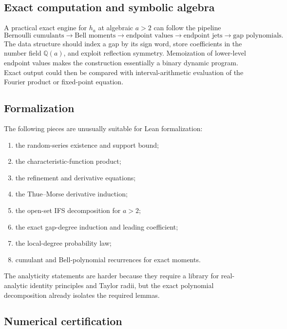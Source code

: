 \documentclass[11pt,oneside]{article}
\theoremstyle{definition}
\theoremstyle{remark}
\begin{document}
\subsection{Exact computation and symbolic algebra}

A practical exact engine for \(h_a\) at algebraic \(a>2\) can follow the pipeline
\begin{equation}
 \text{Bernoulli cumulants}
 \to \text{Bell moments}
 \to \text{endpoint values}
 \to \text{endpoint jets}
 \to \text{gap polynomials}.
 \label{eq:exact-engine-pipeline}
\end{equation}
The data structure should index a gap by its sign word, store coefficients in the number field \(\mathbb Q(a)\), and exploit reflection symmetry.  Memoization of lower-level endpoint values makes the construction essentially a binary dynamic program.  Exact output could then be compared with interval-arithmetic evaluation of the Fourier product or fixed-point equation.

\subsection{Formalization}

The following pieces are unusually suitable for Lean formalization:
\begin{enumerate}
  \item the random-series existence and support bound;
  \item the characteristic-function product;
  \item the refinement and derivative equations;
  \item the Thue--Morse derivative induction;
  \item the open-set IFS decomposition for \(a>2\);
  \item the exact gap-degree induction and leading coefficient;
  \item the local-degree probability law;
  \item cumulant and Bell-polynomial recurrences for exact moments.
\end{enumerate}
The analyticity statements are harder because they require a library for real-analytic identity principles and Taylor radii, but the exact polynomial decomposition already isolates the required lemmas.

\subsection{Numerical certification}
\end{document}
